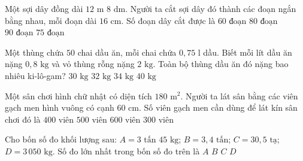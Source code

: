 \begin{ex} %
Một sợi dây đồng dài $12\text{ m } 8\text{ dm}$. Người ta cắt sợi dây đó thành các đoạn ngắn bằng nhau, mỗi đoạn dài $16\text{ cm}$. Số đoạn dây cắt được là
\choice
{$60\text{ đoạn}$}
{\True $80\text{ đoạn}$}
{$90\text{ đoạn}$}
{$75\text{ đoạn}$}
\end{ex}

\begin{ex} %
Một thùng chứa $50$ chai dầu ăn, mỗi chai chứa $0{,}75\text{ l}$ dầu. Biết mỗi lít dầu ăn nặng $0{,}8\text{ kg}$ và vỏ thùng rỗng nặng $2\text{ kg}$. Toàn bộ thùng dầu ăn đó nặng bao nhiêu ki-lô-gam?
\choice
{$30\text{ kg}$}
{\True $32\text{ kg}$}
{$34\text{ kg}$}
{$40\text{ kg}$}
\end{ex}

\begin{ex} %
Một sân chơi hình chữ nhật có diện tích $180\text{ m}^2$. Người ta lát sân bằng các viên gạch men hình vuông có cạnh $60\text{ cm}$. Số viên gạch men cần dùng để lát kín sân chơi đó là
\choice
{$400\text{ viên}$}
{\True $500\text{ viên}$}
{$600\text{ viên}$}
{$300\text{ viên}$}
\end{ex}

\begin{ex} %
Cho bốn số đo khối lượng sau: $A = 3\text{ tấn } 45\text{ kg}$; $B = 3{,}4\text{ tấn}$; $C = 30{,}5\text{ tạ}$; $D = 3\,050\text{ kg}$. Số đo lớn nhất trong bốn số đo trên là
\choice
{$A$}
{\True $B$}
{$C$}
{$D$}
\end{ex}


